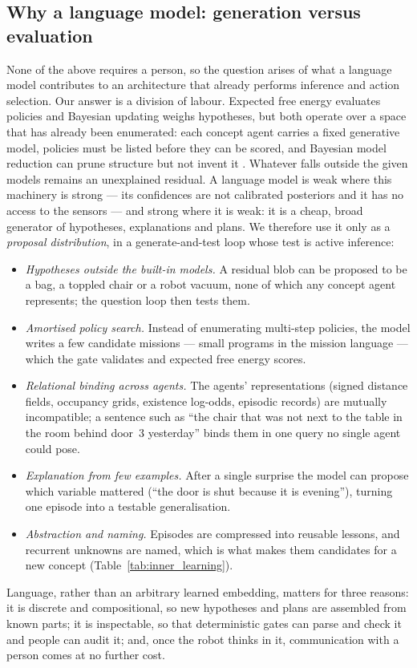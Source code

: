 \subsection{Why a language model: generation versus evaluation}
\label{sec:inner_speech:why_lm}

None of the above requires a person, so the question arises of what a language model contributes to an
architecture that already performs inference and action selection. Our answer is a division of labour. Expected
free energy evaluates policies and Bayesian updating weighs hypotheses, but both operate over a space that has
already been enumerated: each concept agent carries a fixed generative model, policies must be listed before they
can be scored, and Bayesian model reduction can prune structure but not invent it \cite{friston2017curiosity}.
Whatever falls outside the given models remains an unexplained residual. A language model is weak where this
machinery is strong --- its confidences are not calibrated posteriors and it has no access to the sensors --- and
strong where it is weak: it is a cheap, broad generator of hypotheses, explanations and plans. We therefore use it
only as a \emph{proposal distribution}, in a generate-and-test loop whose test is active inference:
\begin{itemize}
    \item \emph{Hypotheses outside the built-in models.} A residual blob can be proposed to be a bag, a toppled
    chair or a robot vacuum, none of which any concept agent represents; the question loop then tests them.
    \item \emph{Amortised policy search.} Instead of enumerating multi-step policies, the model writes a few
    candidate missions --- small programs in the mission language --- which the gate validates and expected free
    energy scores.
    \item \emph{Relational binding across agents.} The agents' representations (signed distance fields, occupancy
    grids, existence log-odds, episodic records) are mutually incompatible; a sentence such as ``the chair that was
    not next to the table in the room behind door~3 yesterday'' binds them in one query no single agent could pose.
    \item \emph{Explanation from few examples.} After a single surprise the model can propose which variable
    mattered (``the door is shut because it is evening''), turning one episode into a testable generalisation.
    \item \emph{Abstraction and naming.} Episodes are compressed into reusable lessons, and recurrent unknowns are
    named, which is what makes them candidates for a new concept (Table~\ref{tab:inner_learning}).
\end{itemize}
Language, rather than an arbitrary learned embedding, matters for three reasons: it is discrete and compositional,
so new hypotheses and plans are assembled from known parts; it is inspectable, so that deterministic gates can parse
and check it and people can audit it; and, once the robot thinks in it, communication with a person comes at no
further cost.

